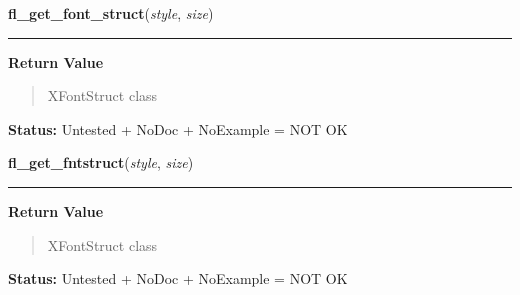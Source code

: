     \vspace{0.5ex}

\hspace{.8\funcindent}\begin{boxedminipage}{\funcwidth}

    \raggedright \textbf{fl\_get\_font\_struct}(\textit{style}, \textit{size})

    \vspace{-1.5ex}

    \rule{\textwidth}{0.5\fboxrule}
\setlength{\parskip}{2ex}
\setlength{\parskip}{1ex}
      \textbf{Return Value}
    \vspace{-1ex}

      \begin{quote}
      XFontStruct class

      \end{quote}

\textbf{Status:} Untested + NoDoc + NoExample = NOT OK



    \end{boxedminipage}

    \label{xformslib:library:fl_get_fontstruct}

    \vspace{0.5ex}

\hspace{.8\funcindent}\begin{boxedminipage}{\funcwidth}

    \raggedright \textbf{fl\_get\_fntstruct}(\textit{style}, \textit{size})

    \vspace{-1.5ex}

    \rule{\textwidth}{0.5\fboxrule}
\setlength{\parskip}{2ex}
\setlength{\parskip}{1ex}
      \textbf{Return Value}
    \vspace{-1ex}

      \begin{quote}
      XFontStruct class

      \end{quote}

\textbf{Status:} Untested + NoDoc + NoExample = NOT OK



    \end{boxedminipage}

    \label{xformslib:library:fl_get_mouse}


